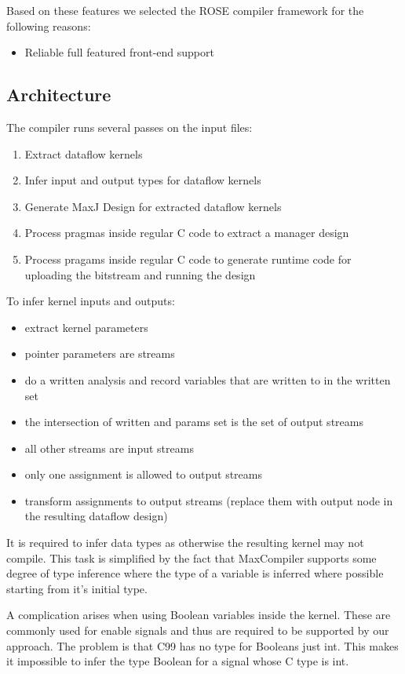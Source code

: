 Based on these features we selected the ROSE compiler framework for the following reasons:
\begin{itemize}
\item Reliable full featured front-end support
\end{itemize}


\subsection{Architecture}

The compiler runs several passes on the input files:

\begin{enumerate}
\item Extract dataflow kernels
\item Infer input and output types for dataflow kernels
\item Generate MaxJ Design for extracted dataflow kernels
\item Process pragmas inside regular C code to extract a manager design
\item Process pragams inside regular C code to generate runtime code for uploading the bitstream and running the design
\end{enumerate}

To infer kernel inputs and outputs:
\begin{itemize}
\item extract kernel parameters
\item pointer parameters are streams
\item do a written analysis and record variables that are written to in the written set
\item the intersection of written and params set is the set of output streams
\item all other streams are input streams
\item only one assignment is allowed to output streams
\item transform assignments to output streams (replace them with output node in the resulting dataflow design)
\end{itemize}

It is required to infer data types as otherwise the resulting kernel
may not compile.  This task is simplified by the fact that MaxCompiler
supports some degree of type inference where the type of a variable is
inferred where possible starting from it's initial type.

A complication arises when using Boolean variables inside the
kernel. These are commonly used for enable signals and thus are
required to be supported by our approach. The problem is that C99 has
no type for Booleans just int. This makes it impossible to infer the
type Boolean for a signal whose C type is int.

